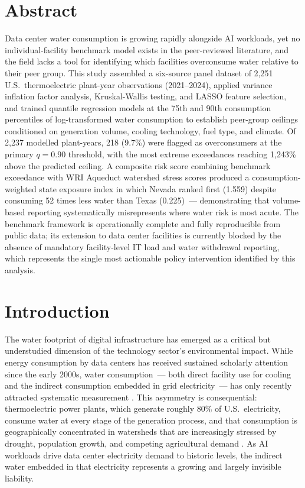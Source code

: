 \documentclass[11pt, letterpaper]{article}
\begin{document}
\section*{Abstract}
\begin{mdframed}[style=abstractbox]
Data center water consumption is growing rapidly alongside AI workloads, yet no individual-facility benchmark model exists in the peer-reviewed literature, and the field lacks a tool for identifying which facilities overconsume water relative to their peer group. This study assembled a six-source panel dataset of 2{,}251 U.S.\ thermoelectric plant-year observations (2021--2024), applied variance inflation factor analysis, Kruskal-Wallis testing, and LASSO feature selection, and trained quantile regression models at the 75th and 90th consumption percentiles of log-transformed water consumption to establish peer-group ceilings conditioned on generation volume, cooling technology, fuel type, and climate. Of 2{,}237 modelled plant-years, 218 (9.7\%) were flagged as overconsumers at the primary $q = 0.90$ threshold, with the most extreme exceedances reaching 1{,}243\% above the predicted ceiling. A composite risk score combining benchmark exceedance with WRI Aqueduct watershed stress scores produced a consumption-weighted state exposure index in which Nevada ranked first (1.559) despite consuming 52 times less water than Texas (0.225)~--- demonstrating that volume-based reporting systematically misrepresents where water risk is most acute. The benchmark framework is operationally complete and fully reproducible from public data; its extension to data center facilities is currently blocked by the absence of mandatory facility-level IT load and water withdrawal reporting, which represents the single most actionable policy intervention identified by this analysis.
\end{mdframed}

\newpage
\tableofcontents
\newpage

\section{Introduction}

The water footprint of digital infrastructure has emerged as a critical but understudied dimension of the technology sector's environmental impact. While energy consumption by data centers has received sustained scholarly attention since the early 2000s, water consumption~--- both direct facility use for cooling and the indirect consumption embedded in grid electricity~--- has only recently attracted systematic measurement \citep{siddik2021}. This asymmetry is consequential: thermoelectric power plants, which generate roughly 80\% of U.S.\ electricity, consume water at every stage of the generation process, and that consumption is geographically concentrated in watersheds that are increasingly stressed by drought, population growth, and competing agricultural demand \citep{kuzma2023}. As AI workloads drive data center electricity demand to historic levels, the indirect water embedded in that electricity represents a growing and largely invisible liability.
\end{document}
